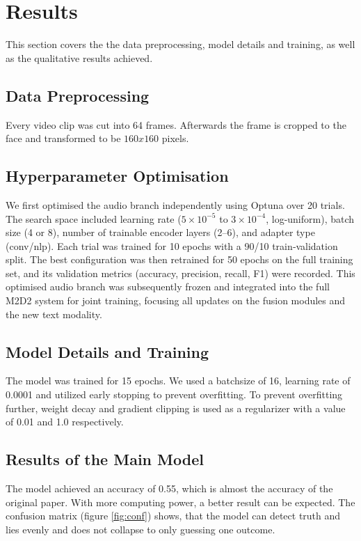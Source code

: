 \section{Results}
\label{sec:results}
This section covers the the data preprocessing, model details and training, as well as the qualitative results achieved.
\subsection{Data Preprocessing}
Every video clip was cut into 64 frames. Afterwards the frame is cropped to the face and transformed to be $160x160$ pixels.

\subsection{Hyperparameter Optimisation}
We first optimised the audio branch independently using Optuna over 20 trials. The search space included learning rate (\(5\times10^{-5}\) to \(3\times10^{-4}\), log-uniform), batch size (4 or 8), number of trainable encoder layers (2–6), and adapter type (conv/nlp). Each trial was trained for 10 epochs with a 90/10 train‑validation split. The best configuration was then retrained for 50 epochs on the full training set, and its validation metrics (accuracy, precision, recall, F1) were recorded. This optimised audio branch was subsequently frozen and integrated into the full M2D2 system for joint training, focusing all updates on the fusion modules and the new text modality.

\subsection{Model Details and Training}
The model was trained for 15 epochs. We used a batchsize of 16, learning rate of 0.0001 and utilized early stopping to prevent overfitting.
To prevent overfitting further, weight decay and gradient clipping is used as a regularizer with a value of 0.01 and 1.0 respectively. 

\subsection{Results of the Main Model}
The model achieved an accuracy of 0.55, which is almost the accuracy of the original paper. With more computing power, a better
result can be expected. The confusion matrix (figure \ref{fig:conf}) shows, that the model can detect truth and lies evenly and 
does not collapse to only guessing one outcome. 

